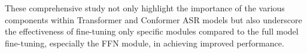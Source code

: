 These comprehensive study not only highlight the importance of the various components within Transformer and Conformer ASR models but also underscore the effectiveness of fine-tuning only specific modules compared to the full model fine-tuning, especially the FFN module, in achieving improved performance.

